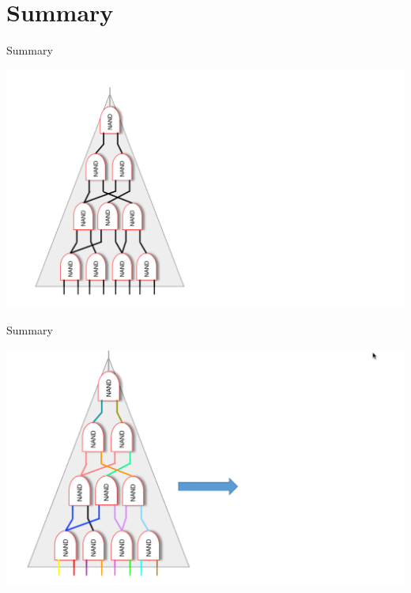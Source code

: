 \documentclass{beamer}
\begin{document}
\section{Summary}

\begin{frame}{Summary}
	\begin{minipage}{0.42\linewidth}
		\includegraphics[scale=0.26]{l1.png}
	\end{minipage}
\end{frame}


\begin{frame}{Summary}
	\begin{minipage}{0.42\linewidth}
		\includegraphics[scale=0.26]{l2.png}
	\end{minipage}
\end{frame}
\end{document}
